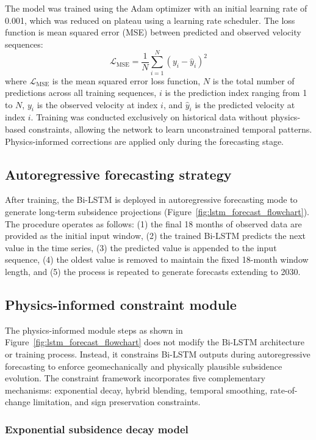 \documentclass[oneside,doublespacing,flushright]{lsuthesis}
\begin{document}
The model was trained using the Adam optimizer \citep{Kingma2014} with an initial learning rate of 0.001, which was reduced on plateau using a learning rate scheduler. The loss function is mean squared error (MSE) between predicted and observed velocity sequences:
\begin{equation}
\mathcal{L}_{\text{MSE}} = \frac{1}{N} \sum_{i=1}^{N} (y_i - \hat{y}_i)^2
\end{equation}
where $\mathcal{L}_{\text{MSE}}$ is the mean squared error loss function, $N$ is the total number of predictions across all training sequences, $i$ is the prediction index ranging from 1 to $N$, $y_i$ is the observed velocity at index $i$, and $\hat{y}_i$ is the predicted velocity at index $i$. Training was conducted exclusively on historical data without physics-based constraints, allowing the network to learn unconstrained temporal patterns. Physics-informed corrections are applied only during the forecasting stage.


\subsection{Autoregressive forecasting strategy}
After training, the Bi-LSTM is deployed in autoregressive forecasting mode to generate long-term subsidence projections (Figure~\ref{fig:lstm_forecast_flowchart}). The procedure operates as follows: (1) the final 18 months of observed data 
are provided as the initial input window, (2) the trained Bi-LSTM predicts the next value in the time series, (3) the predicted value is appended to the input sequence, (4) the oldest value is removed to maintain the fixed 18-month window length, 
and (5) the process is repeated to generate forecasts extending to 2030.

\subsection{Physics-informed constraint module}
The physics-informed module steps as shown in Figure~\ref{fig:lstm_forecast_flowchart} does not modify the Bi-LSTM architecture or training process. Instead, it constrains Bi-LSTM outputs during autoregressive forecasting to enforce geomechanically and physically 
plausible subsidence evolution. The constraint framework incorporates five complementary mechanisms: exponential decay, hybrid blending, temporal smoothing, rate-of-change limitation, and sign preservation constraints.

\subsubsection{Exponential subsidence decay model}
\end{document}
